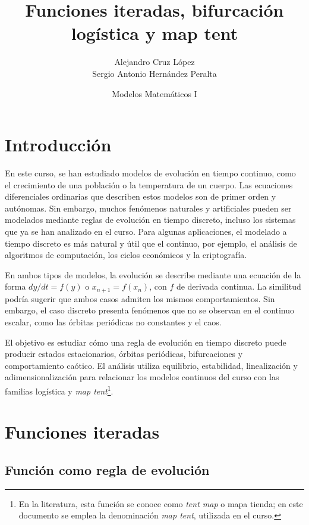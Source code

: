 \documentclass[11pt,letterpaper]{article}
\title{Funciones iteradas, bifurcación logística y map tent}
\author{Alejandro Cruz López \\
        Sergio Antonio Hernández Peralta}
\date{Modelos Matemáticos I}
\theoremstyle{definition}
\theoremstyle{remark}
\begin{document}
\maketitle

\section{Introducción}
\label{sec:introduccion}

En este curso, se han estudiado modelos de evolución en tiempo continuo, como el
crecimiento de una población o la temperatura de un cuerpo. Las ecuaciones
diferenciales ordinarias que describen estos modelos son de primer orden y
autónomas. Sin embargo, muchos fenómenos naturales y artificiales pueden ser
modelados mediante reglas de evolución en tiempo discreto, incluso los sistemas
que ya se han analizado en el curso. Para algunas aplicaciones, el modelado a
tiempo discreto es más natural y útil que el continuo, por ejemplo, el análisis
de algoritmos de computación, los ciclos económicos y la criptografía.


En ambos tipos de modelos, la evolución se describe mediante una ecuación
de la forma \(dy/dt=f(y)\) o \(x_{n+1}=f(x_n)\), con \(f\) de derivada
continua. La similitud podría sugerir que ambos casos admiten los mismos
comportamientos. Sin embargo, el caso discreto presenta fenómenos que no se
observan en el continuo escalar, como las órbitas periódicas no constantes y
el caos.



El objetivo es estudiar cómo una regla de evolución en tiempo discreto puede
producir estados estacionarios, órbitas periódicas, bifurcaciones y
comportamiento caótico. El análisis utiliza equilibrio, estabilidad,
linealización y adimensionalización para relacionar los modelos continuos del
curso con las familias logística y \emph{map tent}\footnote{En la literatura,
esta función se conoce como \emph{tent map} o mapa tienda; en este documento se
emplea la denominación \emph{map tent}, utilizada en el curso.}.


\section{Funciones iteradas}
\label{sec:funciones-iteradas}

\subsection{Función como regla de evolución}
\end{document}
